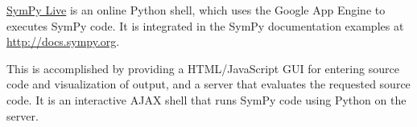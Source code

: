 \href{http://live.sympy.org}{SymPy Live}
is an online Python shell, which uses the Google
App Engine to executes SymPy code. It is integrated in the SymPy
documentation examples at \href{http://docs.sympy.org}{http://docs.sympy.org}.

This is accomplished by providing a HTML/JavaScript GUI for entering
source code and visualization of output, and a server that
evaluates the requested source code. It is an interactive AJAX shell
that runs SymPy code using Python on the server.
